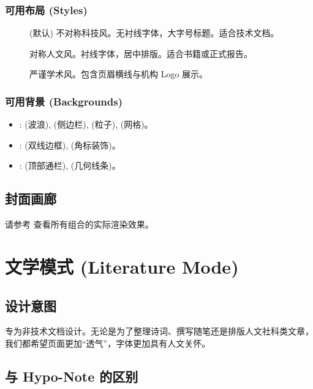 \documentclass[
    outputdir=build,
    colorscheme=Tech,
    shorthand=true,
    code=true,
    fontset=lit
]{Hypo-Note}
\begin{document}
\subsection{可用布局 (Styles)}
\begin{description}
    \item[] (默认) 不对称科技风。无衬线字体，大字号标题。适合技术文档。
    \item[] 对称人文风。衬线字体，居中排版。适合书籍或正式报告。
    \item[] 严谨学术风。包含页眉横线与机构 Logo 展示。
\end{description}

\subsection{可用背景 (Backgrounds)}
\begin{itemize}
    \item {}:  (波浪),  (侧边栏),  (粒子),  (网格)。
    \item {}:  (双线边框),  (角标装饰)。
    \item {}:  (顶部通栏),  (几何线条)。
\end{itemize}

\section{封面画廊}

请参考  查看所有组合的实际渲染效果。

\chapter{文学模式 (Literature Mode)}

\section{设计意图}

 专为非技术文档设计。无论是为了整理诗词、撰写随笔还是排版人文社科类文章，我们都希望页面更加“透气”，字体更加具有人文关怀。

\section{与 Hypo-Note 的区别}
\end{document}
